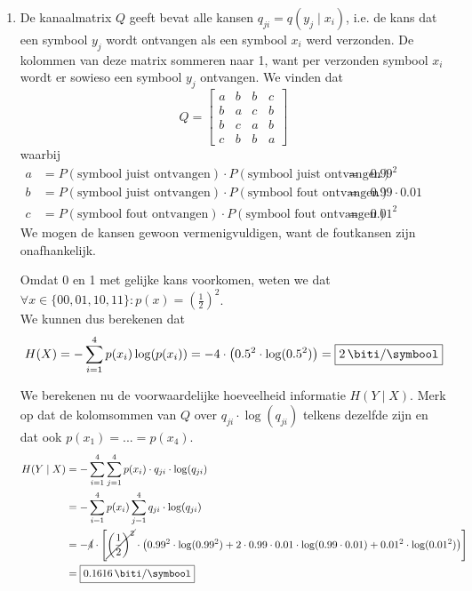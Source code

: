 \documentclass[kulak]{kulakarticle}
\begin{document}
	\begin{enumerate}
		\item De kanaalmatrix \(Q\) geeft bevat alle kansen \(q_{ji}=q(y_j \mid x_i)\), i.e. de kans dat een symbool \(y_j\) wordt ontvangen als een symbool \(x_i\) werd verzonden. De kolommen van deze matrix sommeren naar 1, want per verzonden symbool \(x_i\) wordt er sowieso een symbool \(y_j\) ontvangen. We vinden dat \[
		Q = \begin{bmatrix}
			a & b & b & c \\
			b & a & c & b \\
			b & c & a & b \\
			c & b & b & a
		\end{bmatrix}\] waarbij \begin{align*}
		 a &= P(\text{symbool juist ontvangen}) \cdot P(\text{symbool juist ontvangen}) &=&\, 0.99^2 &&\\
		 b &= P(\text{symbool juist ontvangen}) \cdot P(\text{symbool fout ontvangen}) &=&\, 0.99 \cdot 0.01&&\\
		 c &= P(\text{symbool fout ontvangen}) \cdot P(\text{symbool fout ontvangen}) &=&\, 0.01^2&&
		\end{align*}
		We mogen de kansen gewoon vermenigvuldigen, want de foutkansen zijn onafhankelijk.

		Omdat 0 en 1 met gelijke kans voorkomen, weten we dat \(\forall x \in \{00,01,10,11\} : p(x)=\left(\frac{1}{2}\right)^2\). \\We kunnen dus berekenen dat \[
		H(X)=-\sum_{i=1}^4 p(x_i) \log(p(x_i))=-4 \cdot \left( 0.5^2 \cdot \log(0.5^2) \right) = \boxed{\SI{2}{\biti \per \symbool}} \]

		We berekenen nu de voorwaardelijke hoeveelheid informatie \(H(Y \mid X)\). Merk op dat de kolomsommen van \(Q\) over \(q_{ji} \cdot \log(q_{ji})\) telkens dezelfde zijn en dat ook \(p(x_1)=...=p(x_4)\).
		\begin{align*}
			H(Y \mid X) &= - \sum_{i=1}^{4} \sum_{j=1}^{4} p(x_i) \cdot q_{ji} \cdot \log(q_{ji})\\
					&= - \sum_{i=1}^{4} p(x_i) \sum_{j=1}^{4} q_{ji} \cdot \log(q_{ji})\\
					&= - \cancel{4} \cdot \left[ \cancel{\left(\frac{1}{2}\right)^2} \cdot \left(0.99^2 \cdot \log(0.99^2) + 2 \cdot 0.99 \cdot 0.01 \cdot \log(0.99 \cdot 0.01) + 0.01^2 \cdot \log (0.01^2)\right) \right] \\
					&= \boxed{\SI{0.1616}{\biti \per \symbool}}
		\end{align*}


\end{enumerate}
\end{document}
